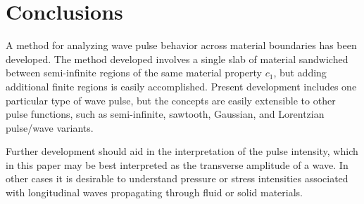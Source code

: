 \documentclass[twocolumn, letterpaper]{article}
\begin{document}

\section*{Conclusions}
A method for analyzing wave pulse behavior across material boundaries has been developed. The method developed involves a single slab of material sandwiched between semi-infinite regions of the same material property $c_1$, but adding additional finite regions is easily accomplished. Present development includes one particular type of wave pulse, but the concepts are easily extensible to other pulse functions, such as semi-infinite, sawtooth, Gaussian, and Lorentzian pulse/wave variants. 

Further development should aid in the interpretation of the pulse intensity, which in this paper may be best interpreted as the transverse amplitude of a wave. In other cases it is desirable to understand pressure or stress intensities associated with longitudinal waves propagating through fluid or solid materials. 
\end{document}
